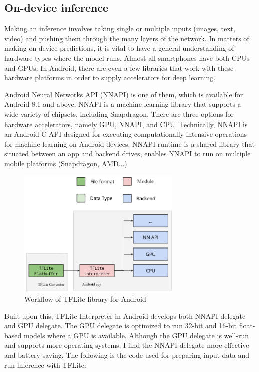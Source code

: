  
\subsection{On-device inference}

Making an inference involves taking single or multiple inputs (images, text, video) and pushing them through the many layers of the network. In matters of making on-device predictions, it is vital to have a general understanding of hardware types where the model runs. Almost all smartphones have both CPUs and GPUs. In Android, there are even a few libraries that work with these hardware platforms in order to supply accelerators for deep learning.  \par

Android Neural Networks API (NNAPI) is one of them, which is available for Android 8.1 and above. NNAPI is a machine learning library that supports a wide variety of chipsets, including Snapdragon. There are three options for hardware accelerators, namely GPU, NNAPI, and CPU. Technically, NNAPI is an Android C API designed for executing computationally intensive operations for machine learning on Android devices. NNAPI runtime is a shared library that situated between an app and backend drives, enables NNAPI to run on multiple mobile platforms (Snapdragon, AMD...) \par
 \begin{figure} [H]
     \centering
     \includegraphics[width=0.7\textwidth]{chapter3/image/client pipleline_edited.png}
     \caption{Workflow of TFLite library for Android}
     \label{fig:my_label}
 \end{figure}
Built upon this, TFLite Interpreter in Android develops both NNAPI delegate and GPU delegate. The GPU delegate is optimized to run 32-bit and 16-bit float-based models where a GPU is available. Although the GPU delegate is well-run and supports more operating systems, I find the NNAPI delegate more effective and battery saving. The following is the code used for preparing input data and run inference with TFLite:\par 
\vspace{5mm}


